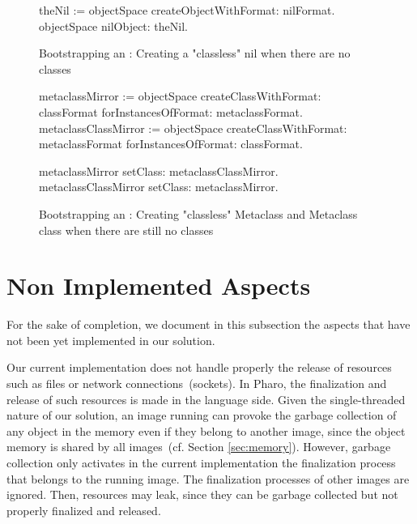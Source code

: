 %

\begin{figure}[htb]
\begin{code}
theNil := objectSpace createObjectWithFormat: nilFormat.
objectSpace nilObject: theNil.
\end{code}
\caption{Bootstrapping an \objectspace: Creating a "classless" nil when there are no classes
\label{code:bootstrap_nil}}
\end{figure}

\begin{figure}[htb]
\begin{code}
metaclassMirror := objectSpace
    createClassWithFormat: classFormat
    forInstancesOfFormat: metaclassFormat.
metaclassClassMirror := objectSpace
    createClassWithFormat: metaclassFormat
    forInstancesOfFormat: classFormat.
 
metaclassMirror             setClass: metaclassClassMirror.
metaclassClassMirror    setClass: metaclassMirror.
\end{code}
\caption{Bootstrapping an \objectspace: Creating "classless" Metaclass and Metaclass class  when there are still no classes
\label{code:bootstrap_classes}}
\end{figure}

\section{Non Implemented Aspects} \label{sec:not_yet_implemented}
 
 For the sake of completion, we document in this subsection the aspects that have not been yet implemented in our solution.
 
Our current implementation does not handle properly the release of resources such as files or network connections~(sockets). In Pharo, the finalization and release of such resources is made in the language side. Given the single-threaded nature of our solution, an image running can provoke the garbage collection of any object in the memory even if they belong to another image, since the object memory is shared by all images~(cf. Section \ref{sec:memory}). However, garbage collection only activates in the current implementation the finalization process that belongs to the running image. The finalization processes of other images are ignored. Then, resources may leak, since they can be garbage collected but not properly finalized and released.

